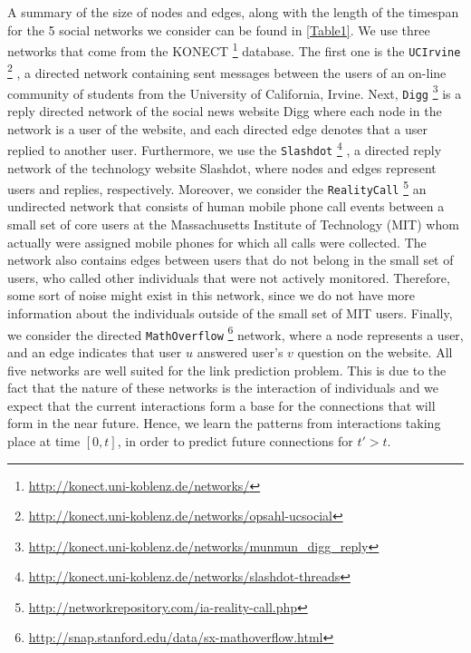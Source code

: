\documentclass{acm_proc_article-sp}
\begin{document}


A summary of the size of nodes and edges, along with the length of the timespan for the 5 social networks we consider can be found in \autoref{Table1}. We use three networks that come from the KONECT \footnote{\url{http://konect.uni-koblenz.de/networks/}} database. The first one is the \texttt{UCIrvine} \footnote{\url{http://konect.uni-koblenz.de/networks/opsahl-ucsocial}} \cite{opsahl2009clustering}, a directed network containing sent messages between the users of an on-line community of students from the University of California, Irvine. Next, \texttt{Digg} \footnote{\url{http://konect.uni-koblenz.de/networks/munmun_digg_reply}}\cite{de2009social} is a reply directed network of the social news website Digg where each node in the network is a user of the website, and each directed edge denotes that a user replied to another user. Furthermore, we use the \texttt{Slashdot} \footnote{\url{http://konect.uni-koblenz.de/networks/slashdot-threads}} \cite{gomez2008statistical}, a directed reply network of the technology website Slashdot, where nodes and edges represent users and replies, respectively. Moreover, we consider the \texttt{RealityCall} \footnote{\url{http://networkrepository.com/ia-reality-call.php}} \cite{eagle2006reality, nr} an undirected network that consists of human mobile phone call events between a small set of core users at the Massachusetts Institute of Technology (MIT) whom actually were assigned mobile phones for which all calls were collected. The network also contains edges between users that do not belong in the small set of users, who called other individuals that were not actively monitored. Therefore, some sort of noise might exist in this network, since we do not have more information about the individuals outside of the small set of MIT users. Finally, we consider the directed \texttt{MathOverflow} \footnote{\url{http://snap.stanford.edu/data/sx-mathoverflow.html}} \cite{Paranjape:2017:MTN:3018661.3018731} network, where a node represents a user, and an edge indicates that user $u$ answered user's $v$ question on the website. All five networks are well suited for the link prediction problem. This is due to the fact that the nature of these networks is the interaction of individuals and we expect that the current interactions form a base for the connections that will form in the near future. Hence, we learn the patterns from interactions taking place at time $[0,t]$, in order to predict future connections for $t' > t$.
\end{document}
